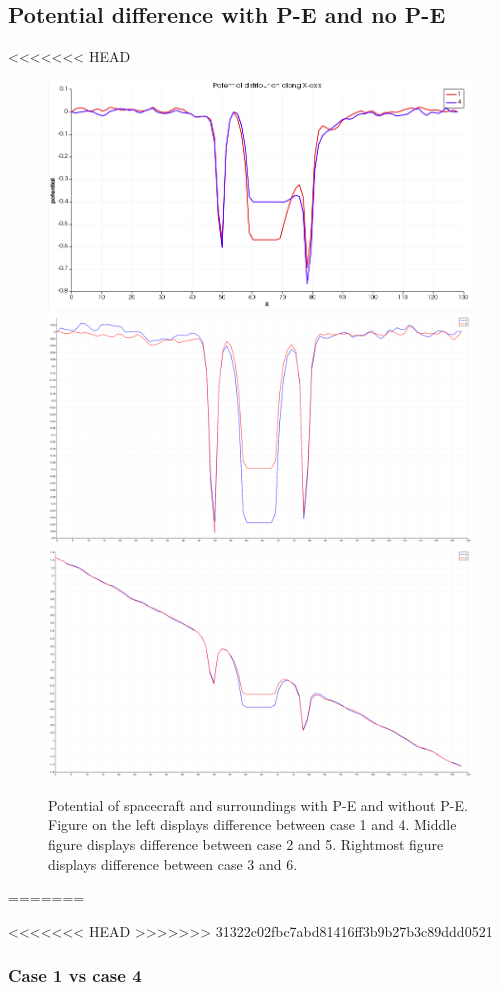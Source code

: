 \subsection{Potential difference with P-E and no P-E}

<<<<<<< HEAD
    \begin{figure}
        \includegraphics[width = 0.3 \textwidth]{potential_case1&4.png}
        \includegraphics[width = 0.3 \textwidth]{images/pot_case25.png}
        \includegraphics[width = 0.3 \textwidth]{images/pot_case36.png}
        \caption{Potential of spacecraft and surroundings with P-E and without P-E.
		Figure on the left displays difference between case 1 and 4. Middle figure
		displays difference between case 2 and 5. Rightmost figure displays difference between case 3 and 6.}
    \end{figure}
=======

<<<<<<< HEAD
>>>>>>> 31322c02fbc7abd81416ff3b9b27b3c89ddd0521


\subsubsection{Case 1 vs case 4}

